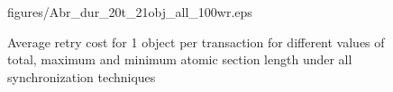 \documentclass[12pt,english]{report}
\begin{document}
\begin{figure}
{{figures/Abr_dur_20t_21obj_all_100wr.eps}
\label{fig:results_1_obj_all_20_tasks}
}
\caption{Average retry cost for 1 object per transaction for different values of total, maximum and minimum atomic section length under all synchronization techniques}
\label{fig:pnf_results_1_obj_all}
\end{figure}

\begin{figure}
\centering

~
~
\subfigure[20 tasks]{
}
\end{figure}
\end{document}
